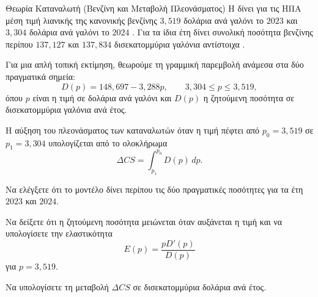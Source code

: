 \begin{problhma}{Θεωρία Καταναλωτή (Βενζίνη και Μεταβολή Πλεονάσματος)}
Η  δίνει για τις ΗΠΑ μέση
τιμή λιανικής της κανονικής βενζίνης $3{,}519$ δολάρια ανά γαλόνι το
$2023$ και $3{,}304$ δολάρια ανά γαλόνι το $2024$
\cite{eiaGasolineRetailPricesAnnual}. Για τα ίδια έτη δίνει συνολική
ποσότητα βενζίνης περίπου $137{,}127$ και $137{,}834$ δισεκατομμύρια
γαλόνια αντίστοιχα \cite{eiaFinishedMotorGasolineProductSuppliedAnnual}.

Για μια απλή τοπική εκτίμηση, θεωρούμε τη γραμμική παρεμβολή ανάμεσα
στα δύο πραγματικά σημεία:
\[
  D(p)=148{,}697-3{,}288p,
  \qquad 3{,}304\leq p\leq3{,}519,
\]
όπου $p$ είναι η τιμή σε δολάρια ανά γαλόνι και $D(p)$ η ζητούμενη
ποσότητα σε δισεκατομμύρια γαλόνια ανά έτος.

Η αύξηση του πλεονάσματος των καταναλωτών όταν η τιμή πέφτει από
$p_0=3{,}519$ σε $p_1=3{,}304$ υπολογίζεται από το ολοκλήρωμα
\[
  \Delta CS=\int_{p_1}^{p_0}D(p)\,dp.
\]
\begin{alist}
\item Να ελέγξετε ότι το μοντέλο δίνει περίπου τις δύο πραγματικές
      ποσότητες για τα έτη $2023$ και $2024$.
\item Να δείξετε ότι η ζητούμενη ποσότητα μειώνεται όταν αυξάνεται η
      τιμή και να υπολογίσετε την ελαστικότητα
      \[
        E(p)=\frac{pD'(p)}{D(p)}
      \]
      για $p=3{,}519$.
\item Να υπολογίσετε τη μεταβολή $\Delta CS$ σε δισεκατομμύρια δολάρια
      ανά έτος.
\end{alist}

\begin{center}
\end{center}
\end{problhma}
